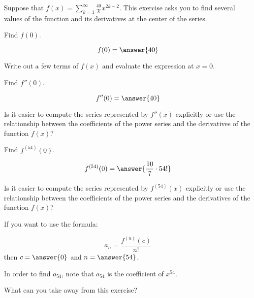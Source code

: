 \documentclass{ximera}
\author{Jim Talamo}
\begin{document}
\begin{exercise}
Suppose that $f(x) = \sum_{k=1}^{\infty} \frac{40}{k}x^{2k-2}$.  This exercise asks you to find several values of the function and its derivatives at the center of the series.

\begin{exercise}
Find $f(0)$.

\[
f(0) = \answer{40}
\]

\begin{hint}
Write out a few terms of $f(x)$ and evaluate the expression at $x=0$.
\end{hint}
\end{exercise}


\begin{exercise}
Find $f''(0)$.

\[
f''(0) = \answer{40}
\]

\begin{hint}
Is it easier to compute the series represented by $f''(x)$ explicitly or use the relationship between the coefficients of the power series and the derivatives of the function $f(x)$?
\end{hint}
\end{exercise}


\begin{exercise}
Find $f^{(54)}(0)$.

\[
f^{(54)}(0) = \answer{\frac{10}{7} \cdot 54!}
\]

\begin{hint}
Is it easier to compute the series represented by $f^{(54)}(x)$ explicitly or use the relationship between the coefficients of the power series and the derivatives of the function $f(x)$?

If you want to use the formula:

\[
a_n = \frac{f^{(n)}(c)}{n!}
\]
then $c=\answer{0}$ and $n=\answer{54}$. 

In order to find $a_{54}$, note that $a_{54}$ is the coefficient of $x^{54}$.  
\end{hint}
\end{exercise}

What can you take away from this exercise?
\end{exercise}
\end{document}

